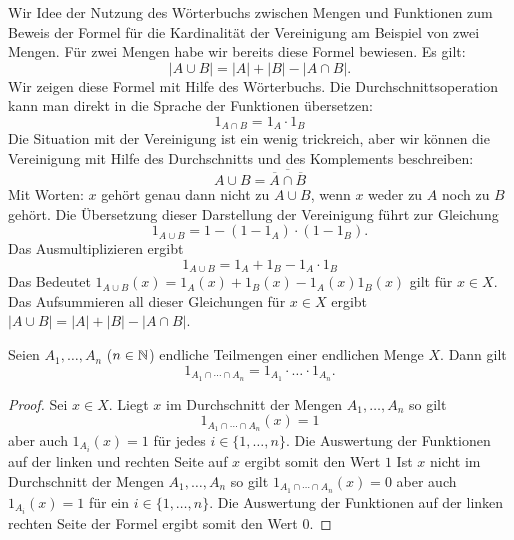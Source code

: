 \begin{bem} 
	Wir Idee der Nutzung des Wörterbuchs zwischen Mengen und Funktionen zum Beweis der Formel für die Kardinalität der Vereinigung am Beispiel von zwei Mengen. Für zwei Mengen habe wir bereits diese Formel bewiesen. Es gilt: 
	\[
			|A \cup B| = |A| + |B| - |A \cap B|.
	\]
	Wir zeigen diese Formel mit Hilfe des Wörterbuchs. 
	Die Durchschnittsoperation kann man direkt in die Sprache der Funktionen übersetzen: 
	\[	
		1_{A \cap B} = 1_A \cdot 1_B
	\] 
	Die Situation mit der Vereinigung ist ein wenig trickreich, aber wir können die Vereinigung mit Hilfe des Durchschnitts und des Komplements beschreiben: 
	\[
		A \cup B = \overline{\overline{ A } \cap \overline{B} }
	\]
	Mit Worten: $x$ gehört genau dann nicht zu $A \cup B$, wenn $x$ weder zu $A$ noch zu $B$ gehört. Die Übersetzung dieser Darstellung der Vereinigung führt zur Gleichung 
	\[
		1_{A \cup B} = 1 - (1 - 1_A) \cdot (1-1_B). 
	\]
	Das Ausmultiplizieren ergibt 
	\[
		1_{A \cup B} = 1_A + 1_B - 1_A \cdot 1_B
	\]
	Das Bedeutet $1_{A \cup B} (x) = 1_{A}(x) + 1_B(x) - 1_A(x) 1_B(x)$ gilt für $x \in X$. Das Aufsummieren all dieser Gleichungen für $x \in X$ ergibt $|A \cup B| = |A| + |B| - |A \cap B|$. 
\end{bem} 

\begin{lem}
	Seien $A_1,\ldots,A_n$ ($n \in \mathbb{N}$) endliche Teilmengen einer endlichen Menge $X$. Dann gilt 
	\[
			1_{A_1 \cap \cdots \cap A_n}  = 1_{A_1} \cdot \ldots \cdot 1_{A_n}. 
	\]
\end{lem} 
\begin{proof}
	Sei $x \in X$. 
	Liegt $x$ im Durchschnitt der Mengen $A_1,\ldots,A_n$ so gilt 
	\[ 1_{A_1 \cap \cdots \cap A_n} (x) =1
	\]  aber auch $1_{A_i}(x)=1$ für jedes $i \in \{1,\ldots,n\}$. Die Auswertung der Funktionen auf der linken und rechten Seite auf $x$  ergibt somit den Wert $1$
	Ist $x$ nicht im Durchschnitt der Mengen $A_1,\ldots,A_n$ so gilt $1_{A_1 \cap \cdots \cap A_n}(x) =0$ aber auch $1_{A_i}(x)=1$ für ein $i \in \{1,\ldots,n\}$. Die Auswertung der Funktionen auf der linken rechten Seite der Formel ergibt somit den Wert $0$. 
\end{proof} 

